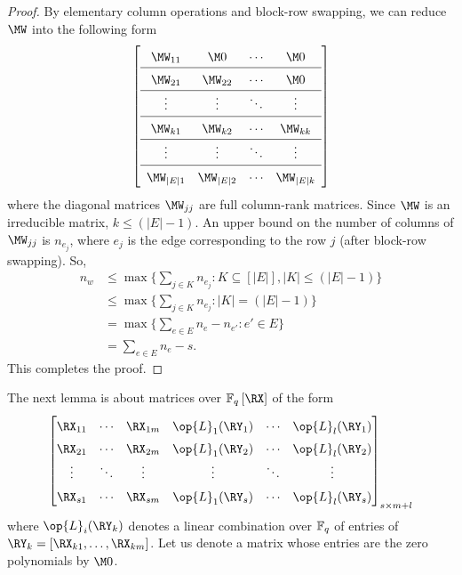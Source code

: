 \begin{proof}
 By  elementary column operations and block-row swapping, we can reduce $\MW$ into the following form
 \begin{align*}
 \renewcommand{\arraystretch}{1.5}
 \left[\begin{array}{cccc}
 \MW_{11}&\M0& \cdots&\M0\\ \hline
 \MW_{21}&\MW_{22}& \cdots &\M0\\ \hline
 \vdots&\vdots&\ddots&\vdots\\ \hline
  \MW_{k1}&\MW_{k2}& \cdots &\MW_{kk}\\ \hline
  \vdots&\vdots&\ddots&\vdots\\ \hline
  \MW_{|E|1}&\MW_{|E|2}& \cdots &\MW_{|E|k}\\
 \end{array}\right]
\end{align*}
 where the diagonal matrices $\MW_{jj}$ are full column-rank matrices. Since $\MW$ is an irreducible matrix, $k \leq (|E|-1)$. An upper bound on  the number of columns of $\MW_{jj}$ is  $n_{e_j}$, where $e_j$ is the edge corresponding to the row $j$ (after block-row swapping). So, 
 \begin{align*}
  n_w & \leq \max\biggl\{\sum_{j\in K} n_{e_j}: K \subseteq [|E|], |K| \leq (|E|-1)\biggr\} \\
  &\leq \max\biggl\{\sum_{j\in K} n_{e_j}:  |K| = (|E|-1)\biggr\}\\
  &= \max\biggl\{\sum_{e\in E} n_e - n_{e'}:  e' \in E\biggr\}\\
  &=\sum_{e\in E} n_e - s.
 \end{align*}
 This completes the proof.
\end{proof}

The next lemma is about matrices over $\Fq\left[\RX\right]$ of the form
\begin{align}
\begin{bmatrix}
\RX_{11}&\cdots &\RX_{1m} & \op{L}_1(\RY_1)&\cdots &\op{L}_{l}(\RY_1) \\
\RX_{21}&\cdots &\RX_{2m} & \op{L}_1(\RY_2)&\cdots &\op{L}_{l}(\RY_2) \\
\vdots &  \ddots & \vdots &\vdots &  \ddots & \vdots\\
\RX_{s1}&\cdots &\RX_{sm} & \op{L}_1(\RY_s)&\cdots &\op{L}_{l}(\RY_s) 
\end{bmatrix}_{s \times m+l} \label{eqn:lemma_matrix}
\end{align}
where $\op{L}_{i}(\RY_k)$  denotes a linear combination over $\mathbb{F}_q$ of entries of $\RY_k=[\RX_{k1}, \ldots ,\RX_{km}]$. Let us denote a matrix whose entries are the zero polynomials by $\M0$.


